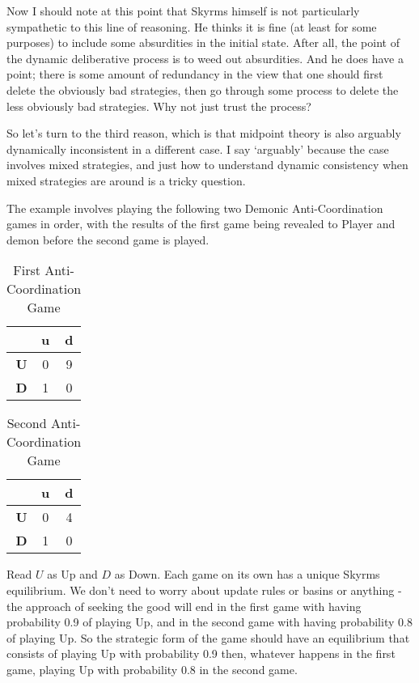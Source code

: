 \documentclass[
  12pt,
]{article}
\begin{document}
Now I should note at this point that Skyrms himself is not particularly
sympathetic to this line of reasoning. He thinks it is fine (at least
for some purposes) to include some absurdities in the initial state.
After all, the point of the dynamic deliberative process is to weed out
absurdities. And he does have a point; there is some amount of
redundancy in the view that one should first delete the obviously bad
strategies, then go through some process to delete the less obviously
bad strategies. Why not just trust the process?

So let's turn to the third reason, which is that midpoint theory is also
arguably dynamically inconsistent in a different case. I say `arguably'
because the case involves mixed strategies, and just how to understand
dynamic consistency when mixed strategies are around is a tricky
question.

The example involves playing the following two Demonic Anti-Coordination
games in order, with the results of the first game being revealed to
Player and demon before the second game is played.

\begin{table}[H]

\caption{\label{tab:unnamed-chunk-13}First Anti-Coordination Game}
\centering
\begin{tabular}[t]{>{}r|cc}

\textbf{} & \textbf{u} & \textbf{d}\\
\midrule
\textbf{U} & 0 & 9\\
\textbf{D} & 1 & 0\\

\end{tabular}
\end{table}

\begin{table}[H]

\caption{\label{tab:unnamed-chunk-14}Second Anti-Coordination Game}
\centering
\begin{tabular}[t]{>{}r|cc}

\textbf{} & \textbf{u} & \textbf{d}\\
\midrule
\textbf{U} & 0 & 4\\
\textbf{D} & 1 & 0\\

\end{tabular}
\end{table}

Read \(U\) as Up and \(D\) as Down. Each game on its own has a unique
Skyrms equilibrium. We don't need to worry about update rules or basins
or anything - the approach of seeking the good will end in the first
game with having probability 0.9 of playing Up, and in the second game
with having probability 0.8 of playing Up. So the strategic form of the
game should have an equilibrium that consists of playing Up with
probability 0.9 then, whatever happens in the first game, playing Up
with probability 0.8 in the second game.
\end{document}

